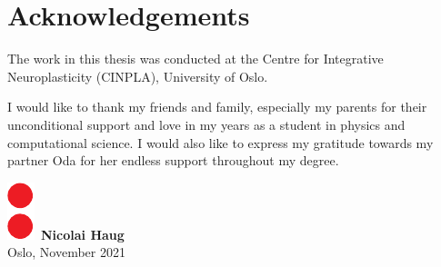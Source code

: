 \chapter*{Acknowledgements}
\thispagestyle{plain}

The work in this thesis was conducted at the Centre for Integrative Neuroplasticity (CINPLA), University of Oslo.




I would like to thank my friends and family, especially my parents for their unconditional support and love in my years as a student in physics and computational science. I would also like to express my gratitude towards my partner Oda for her endless support throughout my degree. 
\\ [8 pt]

\begin{flushright}
\includegraphics[height = 1.5ex]{latex/latex-report/3_Images/Logo/UiO/uio-colon.pdf}\, \textbf{Nicolai Haug}
\\
Oslo, November 2021
\end{flushright}
